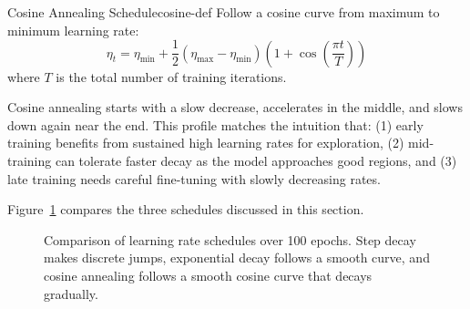 \documentclass[../../main.tex]{subfiles}
\begin{document}
\begin{definition}{Cosine Annealing Schedule}{cosine-def}
Follow a cosine curve from maximum to minimum learning rate:
\[
    \eta_t = \eta_{\min} + \frac{1}{2}(\eta_{\max} - \eta_{\min})\left(1 + \cos\left(\frac{\pi t}{T}\right)\right)
\]
where $T$ is the total number of training iterations.
\end{definition}

\begin{intuition}
Cosine annealing starts with a slow decrease, accelerates in the middle, and slows down again near the end. This profile matches the intuition that: (1) early training benefits from sustained high learning rates for exploration, (2) mid-training can tolerate faster decay as the model approaches good regions, and (3) late training needs careful fine-tuning with slowly decreasing rates.
\end{intuition}

Figure~\ref{fig:lr-schedules} compares the three schedules discussed in this section.

\begin{figure}[htbp]
\centering
{}
\caption{Comparison of learning rate schedules over 100 epochs. Step decay makes discrete jumps, exponential decay follows a smooth curve, and cosine annealing follows a smooth cosine curve that decays gradually.}
\label{fig:lr-schedules}
\end{figure}
\end{document}
